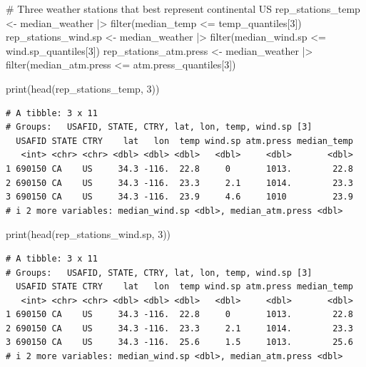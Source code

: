 \documentclass[
  letterpaper,
  DIV=11,
  numbers=noendperiod]{scrartcl}
\newenvironment{Shaded}{\begin{snugshade}}{\end{snugshade}}
\newcommand{\CommentTok}[1]{\textcolor[rgb]{0.37,0.37,0.37}{#1}}
\newcommand{\DecValTok}[1]{\textcolor[rgb]{0.68,0.00,0.00}{#1}}
\newcommand{\FunctionTok}[1]{\textcolor[rgb]{0.28,0.35,0.67}{#1}}
\newcommand{\NormalTok}[1]{\textcolor[rgb]{0.00,0.23,0.31}{#1}}
\newcommand{\OtherTok}[1]{\textcolor[rgb]{0.00,0.23,0.31}{#1}}
\newcommand{\SpecialCharTok}[1]{\textcolor[rgb]{0.37,0.37,0.37}{#1}}
\begin{document}
\begin{Shaded}
\begin{Highlighting}[]
\CommentTok{\# Three weather stations that best represent continental US}
\NormalTok{rep\_stations\_temp }\OtherTok{\textless{}{-}}\NormalTok{ median\_weather }\SpecialCharTok{|\textgreater{}}
\FunctionTok{filter}\NormalTok{(median\_temp }\SpecialCharTok{\textless{}=}\NormalTok{ temp\_quantiles[}\DecValTok{3}\NormalTok{])}
\NormalTok{rep\_stations\_wind.sp }\OtherTok{\textless{}{-}}\NormalTok{ median\_weather }\SpecialCharTok{|\textgreater{}}
\FunctionTok{filter}\NormalTok{(median\_wind.sp }\SpecialCharTok{\textless{}=}\NormalTok{ wind.sp\_quantiles[}\DecValTok{3}\NormalTok{])}
\NormalTok{rep\_stations\_atm.press }\OtherTok{\textless{}{-}}\NormalTok{ median\_weather }\SpecialCharTok{|\textgreater{}}
\FunctionTok{filter}\NormalTok{(median\_atm.press }\SpecialCharTok{\textless{}=}\NormalTok{ atm.press\_quantiles[}\DecValTok{3}\NormalTok{])}
\end{Highlighting}
\end{Shaded}

\begin{Shaded}
\begin{Highlighting}[]
\FunctionTok{print}\NormalTok{(}\FunctionTok{head}\NormalTok{(rep\_stations\_temp, }\DecValTok{3}\NormalTok{))}
\end{Highlighting}
\end{Shaded}

\begin{verbatim}
# A tibble: 3 x 11
# Groups:   USAFID, STATE, CTRY, lat, lon, temp, wind.sp [3]
  USAFID STATE CTRY    lat   lon  temp wind.sp atm.press median_temp
   <int> <chr> <chr> <dbl> <dbl> <dbl>   <dbl>     <dbl>       <dbl>
1 690150 CA    US     34.3 -116.  22.8     0       1013.        22.8
2 690150 CA    US     34.3 -116.  23.3     2.1     1014.        23.3
3 690150 CA    US     34.3 -116.  23.9     4.6     1010         23.9
# i 2 more variables: median_wind.sp <dbl>, median_atm.press <dbl>
\end{verbatim}

\begin{Shaded}
\begin{Highlighting}[]
\FunctionTok{print}\NormalTok{(}\FunctionTok{head}\NormalTok{(rep\_stations\_wind.sp, }\DecValTok{3}\NormalTok{))}
\end{Highlighting}
\end{Shaded}

\begin{verbatim}
# A tibble: 3 x 11
# Groups:   USAFID, STATE, CTRY, lat, lon, temp, wind.sp [3]
  USAFID STATE CTRY    lat   lon  temp wind.sp atm.press median_temp
   <int> <chr> <chr> <dbl> <dbl> <dbl>   <dbl>     <dbl>       <dbl>
1 690150 CA    US     34.3 -116.  22.8     0       1013.        22.8
2 690150 CA    US     34.3 -116.  23.3     2.1     1014.        23.3
3 690150 CA    US     34.3 -116.  25.6     1.5     1013.        25.6
# i 2 more variables: median_wind.sp <dbl>, median_atm.press <dbl>
\end{verbatim}
\end{document}
